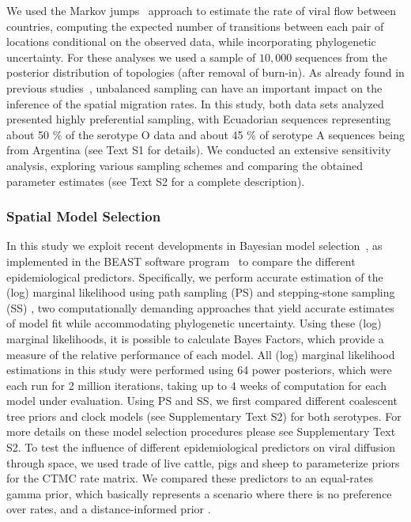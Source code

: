 \documentclass[10pt]{article}
\begin{document}
We used the Markov jumps~\cite{Minin2008} approach to estimate the rate of viral flow between countries, computing the expected number of transitions between each pair of locations conditional on the observed data, while incorporating phylogenetic uncertainty.
For these analyses we used a sample of $10,000$ sequences from the posterior distribution of topologies (after removal of burn-in). 
As already found in previous studies~\cite{Faria2012, Lemey2014}, unbalanced sampling can have an important impact on the inference of the spatial migration rates.
In this study, both data sets analyzed presented highly preferential sampling, with Ecuadorian sequences representing about 50 \% of the serotype O data and about 45 \% of serotype A sequences being from Argentina (see Text S1 for details).
We conducted an extensive sensitivity analysis, exploring various sampling schemes and comparing the obtained parameter estimates (see Text S2 for a complete description).

\subsubsection*{Spatial Model Selection}

In this study we exploit recent developments in Bayesian model selection~\cite{Baele2012,Baele2013a,Baele2013b}, as implemented in the BEAST software program~\cite{beast2012} to compare the different epidemiological predictors.
Specifically, we perform accurate estimation of the (log) marginal likelihood using path sampling (PS) \cite{LartillotPhilippe} and stepping-stone sampling (SS) \cite{Xie}, two computationally demanding approaches that yield accurate estimates of model fit while accommodating phylogenetic uncertainty.
Using these (log) marginal likelihoods, it is possible to calculate Bayes Factors, which provide a measure of the relative performance of each model. 
All (log) marginal likelihood estimations in this study were performed using 64 power posteriors, which were each run for 2 million iterations, taking up to 4 weeks of computation for each model under evaluation. 
Using PS and SS, we first compared different coalescent tree priors and clock models (see Supplementary Text S2) for both serotypes. 
For more details on these model selection procedures please see Supplementary Text S2.
To test the influence of different epidemiological predictors on viral diffusion through space, we used trade of live cattle, pigs and sheep to parameterize priors for the CTMC rate matrix.
We compared these predictors to an equal-rates gamma prior, which basically represents a scenario where there is no preference over rates, and a distance-informed prior \cite{roots}.
\end{document}
